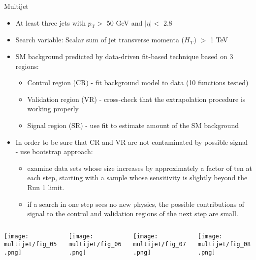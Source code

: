 \documentclass[8pt]{beamer}
\begin{document}
\begin{frame}{\large Multijet}
 \begin{itemize}
  \item At least three jets with $p_\mathrm{T} >$ 50 GeV and $|\eta| <$ 2.8
  \item Search variable: Scalar sum of jet transverse momenta ($H_\mathrm{T}$) $>$ 1 TeV
  \item SM background predicted by data-driven fit-based technique based on 3 regions:
  \begin{itemize}
   \item Control region (CR) - fit background model to data (10 functions tested)
   \item Validation region (VR) - cross-check that the extrapolation procedure is working properly
   \item Signal region (SR) - use fit to estimate amount of the SM background
  \end{itemize}
  \item In order to be sure that CR and VR are not contaminated by possible signal - 
	use bootstrap approach:
  \begin{itemize}
   \item examine data sets whose size increases by approximately a factor of ten at each step, 
   starting with a sample whose sensitivity is slightly beyond the Run 1 limit.
   \item if a search in one step sees no new physics, the possible contributions of signal to 
   the control and validation regions of the next step are small.
  \end{itemize}
 \end{itemize}
 
 \begin{columns}
  \begin{column}{3cm}
   \texttt{[image: multijet/fig\_05.png]}\\
  \end{column}
  \begin{column}{3cm}
   \texttt{[image: multijet/fig\_06.png]}\\
  \end{column}
  \begin{column}{3cm}
   \texttt{[image: multijet/fig\_07.png]}\\
  \end{column}
  \begin{column}{3cm}
   \texttt{[image: multijet/fig\_08.png]}\\
  \end{column}
 \end{columns}

\end{frame}
\end{document}
